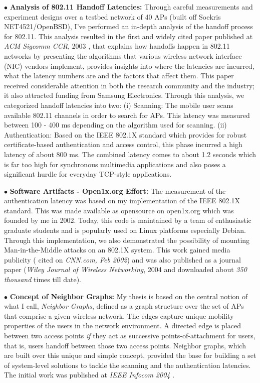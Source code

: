 \documentclass[11pt,letterpaper]{article}
\begin{document}
$\bullet$ {\bf Analysis of 802.11 Handoff Latencies:} Through careful measurements and experiment designs over
a testbed network  of 40 APs (built off Soekris NET4521/OpenBSD), I've performed an in-depth analysis of the handoff
process for 802.11. This analysis resulted in the first and  widely cited paper published at {\it ACM Sigcomm CCR},
2003 \cite{ccr-handoff}, that explains how handoffs happen in 802.11 networks by presenting the algorithms that various wireless network
interface (NIC) vendors implement, provides insights into where the latencies are incurred, what the latency numbers are
and the factors that affect them. This paper received considerable attention in both the research community and the
industry; it also attracted funding from Samsung Electronics.
Through this analysis, we categorized handoff latencies into two: (i) Scanning: The mobile user scans available 802.11
channels in order to search for APs. This latency was measured between 100 - 400 ms depending on the algorithm
used for scanning. (ii) Authentication: Based on the IEEE 802.1X standard which provides for robust certificate-based
authentication and access control,
this phase incurred a high latency of about 800 ms. The combined latency comes to about 1.2 seconds which is far
too high for synchronous multimedia applications and also poses a significant hurdle for everyday TCP-style
applications. 

$\bullet$ {\bf Software Artifacts - Open1x.org Effort:} The measurement of the authentication latency was based on my
implementation of the IEEE 802.1X standard.  This was made available as opensource on  open1x.org which was founded
by me in 2002. Today, this code is maintained by a team of enthusiastic  graduate students and is popularly used on Linux
platforms especially Debian. Through this implementation, we also demonstrated the possibility of mounting
Man-in-the-Middle attacks on an 802.1X system. This work gained media publicity ( cited on {\it CNN.com, Feb 2002}) and
was also published as a journal paper ({\it Wiley Journal of Wireless Networking}, 2004 \cite{security2004} and
downloaded about {\it 350 thousand} times till date). 
  
$\bullet$ {\bf Concept of Neighbor Graphs:} My thesis is based on the central notion of what I call, {\it
Neighbor Graphs}, defined as a graph structure over the set of APs that comprise a given wireless
network. The edges capture unique mobility properties of the users in the network environment. A directed edge is placed
between two access points {\it if} they act as successive points-of-attachment for users, that is, users handoff between
those two access points. Neighbor graphs, which are built over this unique and simple concept, provided the base for
building a set of system-level solutions to tackle the scanning and the authentication latencies. The initial work was
published at {\it IEEE Infocom 2004} \cite{mishra2004}.
\end{document}
